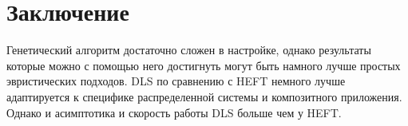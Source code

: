 \chapter*{Заключение}




\begin{spacing}{1.3}
Генетический алгоритм достаточно сложен в настройке, однако результаты которые можно с помощью него достигнуть могут быть намного лучше простых эвристических подходов. DLS по сравнению с HEFT немного лучше адаптируется к специфике распределенной системы и композитного приложения. Однако и асимптотика и скорость работы DLS больше чем у HEFT.
\end{spacing}

